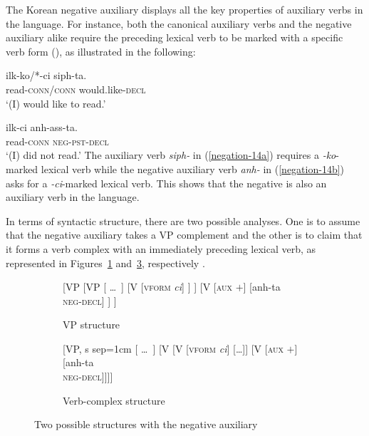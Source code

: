 \documentclass[output=paper
                ,modfonts
                ,nonflat
	        ,collection
	        ,collectionchapter
	        ,collectiontoclongg
 	        ,biblatex
                ,babelshorthands
                ,newtxmath
                ,draftmode
                ,colorlinks, citecolor=brown
]{./langsci/langscibook}
\begin{document}
{\begin{exe}
\begin{xlist}
\begin{exe}
\begin{xlist}
%


%
The Korean negative auxiliary displays all the key properties of auxiliary verbs in the language. For instance, both the canonical auxiliary verbs and
the negative auxiliary alike require the preceding lexical verb to be marked with a specific verb form (\vform), as illustrated
in the following:

\eal
\ex\label{negation-14a}
\gll ilk-ko/*-ci siph-ta. \\
     read-\textsc{conn}/\textsc{conn} would.like-\textsc{decl} \\
\glt `(I) would like to read.'

\ex\label{negation-14b}
\gll ilk-ci anh-ass-ta. \\
     read-\textsc{conn} \textsc{neg}-\textsc{pst}-\textsc{decl} \\
\glt `(I) did not read.'
\zl
\noindent
The auxiliary verb \textit{siph-} in (\ref{negation-14a}) requires a
\textit{-ko}-marked lexical verb while the negative auxiliary
 verb \textit{anh-} in (\ref{negation-14b}) asks for a \textit{-ci}-marked lexical
 verb. This shows that the negative is also an auxiliary verb in the language.

In terms of syntactic structure, there
are two possible analyses.  One is to assume that the negative auxiliary takes a VP complement and the other is to claim that it forms a verb complex with
an immediately preceding lexical verb, as represented in Figures~\ref{negation-fig:3a} and~\ref{negation-fig:3b}, respectively
\citep{Chung98a-u, Kim:16}.
%
\begin{figure}
	\begin{subfigure}[b]{0.48\textwidth}
\centering
		\begin{forest}
			[VP
				[VP
					[ \dots\ ]
					[V {[\textsc{vform} \textit{ci}]}
					]
					]
				[V {[\textsc{aux $+$}]}
					[anh-ta\\ \textsc{neg-decl}]
				]
			]	
		\end{forest}
	\caption{VP structure}\label{negation-fig:3a}
		\end{subfigure}	
\hfill
	\begin{subfigure}[b]{0.48\textwidth}
\centering
		\begin{forest}
			[VP, s sep=1cm
				[ \dots\ ]
				[V
					[V {[\textsc{vform} \textit{ci}]}
						[\dots]]
					[V {[\textsc{aux $+$}]}
						[anh-ta\\ \textsc{neg-decl}]]]]
		\end{forest}
	\caption{Verb-complex structure}\label{negation-fig:3b}	
		\end{subfigure}
	\caption{Two possible structures with the negative auxiliary}
\end{figure}


\end{xlist}
\end{exe}
\end{xlist}
\end{exe}}
\end{document}
